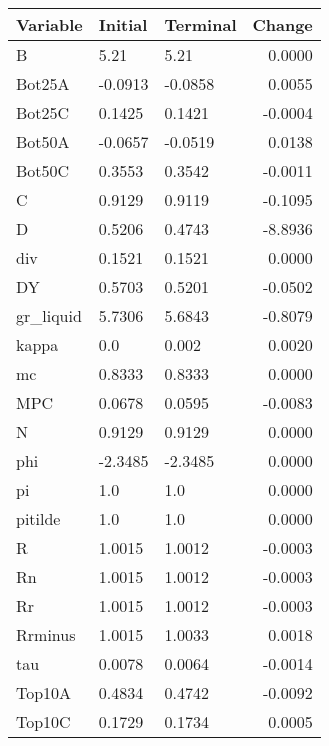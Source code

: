 \begin{table}
\centering
\label{tab:stst_comparison_fast_shock_wedge_permanent}
\begin{tabular}{lllr}
\toprule
                Variable & Initial & Terminal &  Change \\
\midrule
                       B &    5.21 &     5.21 &  0.0000 \\
                  Bot25A & -0.0913 &  -0.0858 &  0.0055 \\
                  Bot25C &  0.1425 &   0.1421 & -0.0004 \\
                  Bot50A & -0.0657 &  -0.0519 &  0.0138 \\
                  Bot50C &  0.3553 &   0.3542 & -0.0011 \\
                       C &  0.9129 &   0.9119 & -0.1095 \\
                       D &  0.5206 &   0.4743 & -8.8936 \\
                     div &  0.1521 &   0.1521 &  0.0000 \\
                      DY &  0.5703 &   0.5201 & -0.0502 \\
               gr\_liquid &  5.7306 &   5.6843 & -0.8079 \\
                   kappa &     0.0 &    0.002 &  0.0020 \\
                      mc &  0.8333 &   0.8333 &  0.0000 \\
                     MPC &  0.0678 &   0.0595 & -0.0083 \\
                       N &  0.9129 &   0.9129 &  0.0000 \\
                     phi & -2.3485 &  -2.3485 &  0.0000 \\
                      pi &     1.0 &      1.0 &  0.0000 \\
                 pitilde &     1.0 &      1.0 &  0.0000 \\
                       R &  1.0015 &   1.0012 & -0.0003 \\
                      Rn &  1.0015 &   1.0012 & -0.0003 \\
                      Rr &  1.0015 &   1.0012 & -0.0003 \\
                 Rrminus &  1.0015 &   1.0033 &  0.0018 \\
                     tau &  0.0078 &   0.0064 & -0.0014 \\
                  Top10A &  0.4834 &   0.4742 & -0.0092 \\
                  Top10C &  0.1729 &   0.1734 &  0.0005 \\

\end{tabular}
\end{table}
